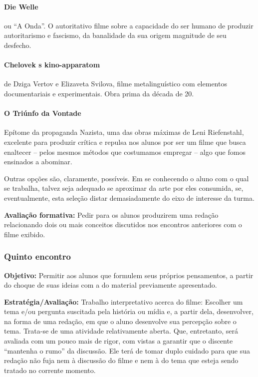 \documentclass[12pt,a4paper]{article}
\begin{document}
	\paragraph{Die Welle} ou ``A Onda''. O autoritativo 
		filme sobre a capacidade do ser humano de 
		produzir autoritarismo e fascismo, da banalidade
		da sua origem magnitude de seu desfecho.

	\paragraph{Chelovek s kino-apparatom} de Dziga Vertov e
		Elizaveta Svilova, filme metalinguístico com 
		elementos documentariais e experimentais. Obra 
		prima da década de 20.

	\paragraph{O Triúnfo da Vontade} Epítome da propaganda 
		Nazista, uma das obras máximas de Leni 
		Riefenstahl, excelente para produzir crítica e 
		repulsa nos alunos por ser um filme que busca 
		enaltecer -- pelos mesmos métodos que costumamos 
		empregar -- algo que fomos ensinados a abominar.
		
	Outras opções são, claramente, possíveis. Em se conhecendo 
	o aluno com o qual se trabalha, talvez seja adequado se 
	aproximar da arte por eles consumida, se, eventualmente, 
	esta seleção distar demasiadamente do eixo de interesse 
	da turma. 

	\textbf{Avaliação formativa:} Pedir para os alunos produzirem 
	uma redação relacionando dois ou mais conceitos discutidos nos 
	encontros anteriores com o filme exibido. 

	\subsubsection{Quinto encontro}
	
	\textbf{Objetivo:} Permitir aos alunos que formulem seus 
	próprios pensamentos, a partir do choque de suas ideias 
	com a do material previamente apresentado. 

	\textbf{Estratégia/Avaliação:}
	Trabalho interpretativo acerca do filme: 
	Escolher um tema e/ou pergunta suscitada pela história ou 
	mídia e, a partir dela, desenvolver, na forma de uma redação, 
	em que o aluno desenvolve sua percepção sobre o tema. Trata-se 
	de uma atividade relativamente aberta. Que, entretanto, será 
	avaliada com um pouco mais de rigor, com vistas a garantir 
	que o discente ``mantenha o rumo'' da discussão. Ele terá de 
	tomar duplo cuidado para que sua redação não fuja nem à 
	discussão do filme e nem à do tema que esteja sendo tratado 
	no corrente momento. 
\end{document}
